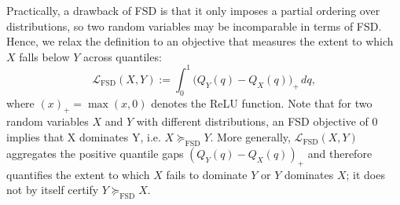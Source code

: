 







Practically, a drawback of FSD is that it only imposes a partial ordering over distributions, so two random variables may be incomparable in terms of FSD. Hence, we relax the definition to an objective that measures the extent to which $X$ falls below $Y$ across quantiles:
\begin{equation}
  \mathcal{L}_{\mathrm{FSD}}(X,Y)
  := \int_{0}^{1} \big(Q_Y(q)-Q_X(q)\big)_+\, dq,
  \label{eq:fsd_loss}
\end{equation}
where $(x)_+=\max(x,0)$ denotes the ReLU function. Note that for two random variables $X$ and $Y$ with different distributions, an FSD objective of $0$ implies that X dominates Y, i.e.  $X \succeq_{\mathrm{FSD}} Y$. More generally,  $\mathcal{L}_{\mathrm{FSD}}(X,Y)$  aggregates the positive quantile gaps  $(Q_Y(q)-Q_X(q))_+$  and therefore quantifies the extent to which  $X$  fails to dominate  $Y$ or $Y$ dominates $X$; it does not by itself certify  $Y\succeq_{\mathrm{FSD}}X$.

